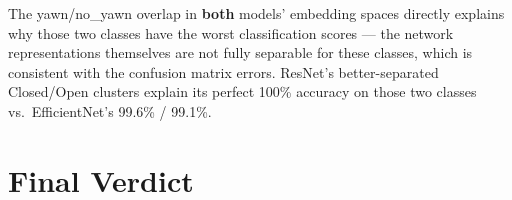 \documentclass[12pt,a4paper]{article}
\begin{document}
\begin{tcolorbox}[findingbox, title=t-SNE Interpretation]
The yawn/no\_yawn overlap in \textbf{both} models' embedding spaces directly
explains why those two classes have the worst classification scores —
the network representations themselves are not fully separable for these classes,
which is consistent with the confusion matrix errors.
ResNet's better-separated Closed/Open clusters explain its perfect 100\% accuracy
on those two classes vs.\ EfficientNet's 99.6\% / 99.1\%.
\end{tcolorbox}

\section{Final Verdict}
\end{document}
